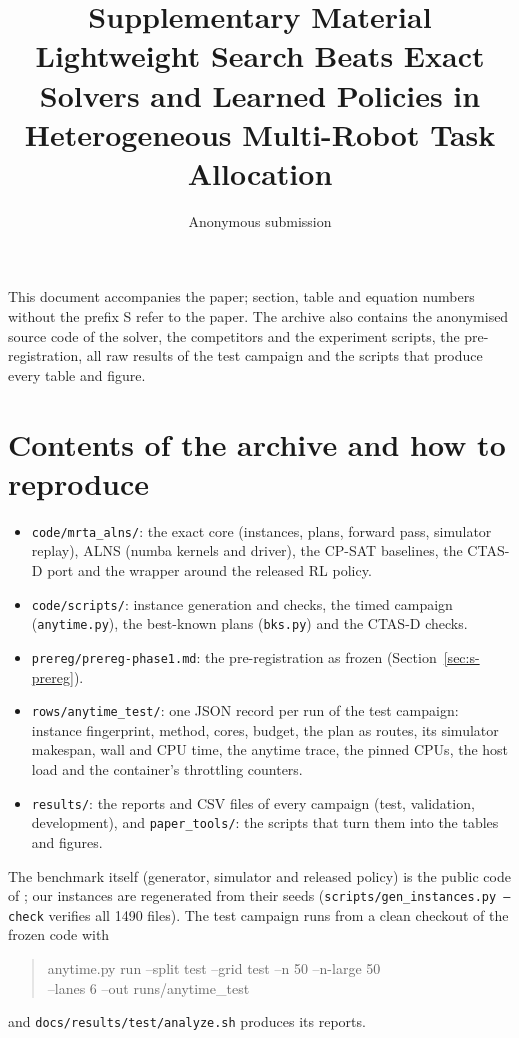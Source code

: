 \documentclass[10pt]{article}
\title{Supplementary Material\\[0.3ex]\large Lightweight Search Beats Exact Solvers and Learned Policies in Heterogeneous Multi-Robot Task Allocation}
\author{Anonymous submission}
\date{}
\begin{document}
\maketitle

\noindent This document accompanies the paper; section, table and equation numbers without the prefix S refer to the
paper. The archive also contains the anonymised source code of the solver, the competitors and the experiment scripts,
the pre-registration, all raw results of the test campaign and the scripts that produce every table and figure.

\section{Contents of the archive and how to reproduce}
\label{sec:s-archive}

\begin{itemize}
\item \texttt{code/mrta\_alns/}: the exact core (instances, plans, forward pass, simulator replay), ALNS (numba kernels and
  driver), the CP-SAT baselines, the CTAS-D port and the wrapper around the released RL policy.
\item \texttt{code/scripts/}: instance generation and checks, the timed campaign (\texttt{anytime.py}), the best-known
  plans (\texttt{bks.py}) and the CTAS-D checks.
\item \texttt{prereg/prereg-phase1.md}: the pre-registration as frozen (Section~\ref{sec:s-prereg}).
\item \texttt{rows/anytime\_test/}: one JSON record per run of the test campaign: instance fingerprint, method, cores,
  budget, the plan as routes, its simulator makespan, wall and CPU time, the anytime trace, the pinned CPUs, the host
  load and the container's throttling counters.
\item \texttt{results/}: the reports and CSV files of every campaign (test, validation, development), and \texttt{paper\_tools/}:
  the scripts that turn them into the tables and figures.
\end{itemize}
The benchmark itself (generator, simulator and released policy) is the public code of \citet{dai2025heterogeneous}; our
instances are regenerated from their seeds (\texttt{scripts/gen\_instances.py --check} verifies all 1490 files). The
test campaign runs from a clean checkout of the frozen code with
\begin{quote}\small\ttfamily
anytime.py run --split test --grid test --n 50 --n-large 50\\
\hspace*{1em}--lanes 6 --out runs/anytime\_test
\end{quote}
and \texttt{docs/results/test/analyze.sh} produces its reports.
\end{document}
